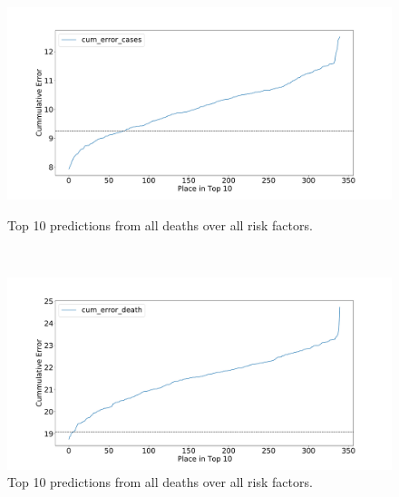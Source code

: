 \documentclass[12pt]{article}
\theoremstyle{definition}
\renewcommand{\_}{%
    \textunderscore\hspace{0pt}%
}
\begin{document}
\begin{figure}[!h]
\begin{minipage}{.45\textwidth}
        \centering
        \includegraphics[width=1.0\textwidth]{images/predict/PlaceTop10_Cases.pdf}
        \vspace{-1cm}
        \caption{Top 10 predictions from all deaths  over all risk factors.}
        \label{fig:place-top10-cases}
    \end{minipage}
    \ \
    \begin{minipage}{.45\textwidth}
        
        \centering
        \includegraphics[width=1.0\textwidth]{images/predict/PlaceTop10_Death.pdf}
        \vspace{-1cm}
        \caption{Top 10 predictions from all deaths over all risk factors.}
        \label{fig:place-top10-death}
    \end{minipage}
\end{figure}
\end{document}
